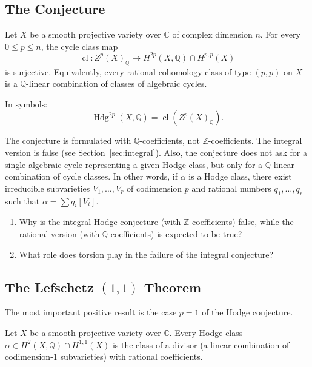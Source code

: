 \subsection{The Conjecture}

\begin{conjecture}[Hodge, 1950]
\label{conj:hodge}
Let $X$ be a smooth projective variety over $\mathbb{C}$ of complex dimension $n$. For every $0 \le p \le n$, the cycle class map
\[
\operatorname{cl}: Z^p(X)_{\mathbb{Q}} \to H^{2p}(X, \mathbb{Q}) \cap H^{p,p}(X)
\]
is surjective. Equivalently, every rational cohomology class of type $(p,p)$ on $X$ is a $\mathbb{Q}$-linear combination of classes of algebraic cycles.
\end{conjecture}

In symbols:
\[
\operatorname{Hdg}^{2p}(X, \mathbb{Q}) = \operatorname{cl}(Z^p(X)_{\mathbb{Q}}).
\]

\begin{remark}
The conjecture is formulated with $\mathbb{Q}$-coefficients, not $\mathbb{Z}$-coefficients. The integral version is false (see Section~\ref{sec:integral}). Also, the conjecture does not ask for a single algebraic cycle representing a given Hodge class, but only for a $\mathbb{Q}$-linear combination of cycle classes. In other words, if $\alpha$ is a Hodge class, there exist irreducible subvarieties $V_1, \ldots, V_r$ of codimension $p$ and rational numbers $q_1, \ldots, q_r$ such that $\alpha = \sum q_i [V_i]$.
\end{remark}

\begin{checkyou}
\begin{enumerate}
\item Why is the integral Hodge conjecture (with $\mathbb{Z}$-coefficients) false, while the rational version (with $\mathbb{Q}$-coefficients) is expected to be true?
\item What role does torsion play in the failure of the integral conjecture?
\end{enumerate}
\end{checkyou}

\subsection{The Lefschetz $(1,1)$ Theorem}

The most important positive result is the case $p = 1$ of the Hodge conjecture.

\begin{theorem}
\label{thm:lef11}
Let $X$ be a smooth projective variety over $\mathbb{C}$. Every Hodge class $\alpha \in H^2(X, \mathbb{Q}) \cap H^{1,1}(X)$ is the class of a divisor (a linear combination of codimension-1 subvarieties) with rational coefficients.
\end{theorem}

